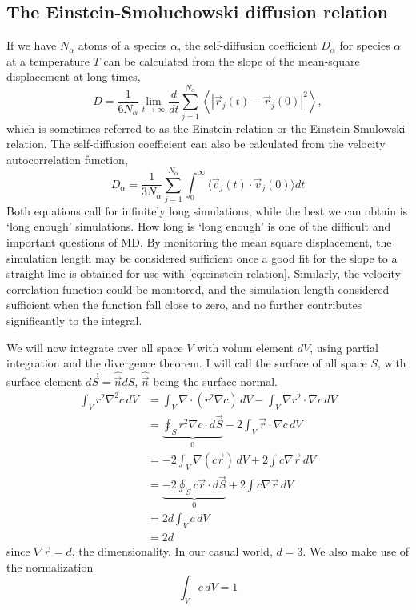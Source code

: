 \documentclass[11pt,bibliography=totoc,index=totoc]{scrbook}   %
\begin{document}
\subsection{The Einstein-Smoluchowski diffusion relation}




If we have $N_{\alpha}$ atoms of a species $\alpha$, the self-diffusion coefficient $D_{\alpha}$ for species $\alpha$ at a temperature $T$ can be calculated from the slope of the mean-square displacement at long times,
\begin{equation}
  D = \frac{1}{6N_{\alpha}} \lim_{t\to\infty} \frac{d}{dt} \sum_{j=1}^{N_{\alpha}} \left \langle |\vec{r}_j(t)-\vec{r}_j(0)|^2 \right\rangle,
  \label{eq:einstein-relation}
\end{equation}
which is sometimes referred to as the Einstein relation or the Einstein Smulowski relation. 
The self-diffusion coefficient can also be calculated from the velocity autocorrelation function,
\begin{equation}
  D_{\alpha} = \frac{1}{3N_{\alpha}} \sum_{j=1}^{N_{\alpha}} \int_0^{\infty} \langle \vec{v}_j(t) \cdot \vec{v}_j(0) \rangle dt
\end{equation}
Both equations call for infinitely long simulations, while the best we can obtain is `long enough' simulations. 
How long is `long enough' is one of the difficult and important questions of MD.
By monitoring the mean square displacement, the simulation length may be considered sufficient once a good fit for the slope to a straight line is obtained for use with \eqref{eq:einstein-relation}.
Similarly, the velocity correlation function could be monitored, and the simulation length considered sufficient when the function fall close to zero, 
and no further contributes significantly to the integral.

We will now integrate over all space $V$ with volum element $dV$, using partial integration and the divergence theorem.
I will call the surface of all space $S$, with surface element $d\vec{S}=\hat{\vec{n}}dS$, $\hat{\vec{n}}$ being the surface normal.
\begin{align}
  \int_V r^2 \nabla^2 c \,dV &= \int_V \nabla\cdot (r^2\nabla c) \,dV - \int_V \nabla r^2 \cdot \nabla c \, dV \\
  &= \underbrace{\oint_S r^2 \nabla c \cdot d\vec{S}}_0 - 2\int_V \vec{r}\cdot\nabla c \,dV \\
  &= -2\int_V \nabla (c\vec{r}) \,dV + 2 \int c \nabla \vec{r} \, dV \\
  &= \underbrace{-2\oint_S c\vec{r}\cdot d\vec{S}}_0 + 2 \int c \nabla \vec{r} \, dV \\
  &= 2d\int_V c \, dV \\
  &= 2d
\end{align}
since $\nabla\vec{r} = d$, the dimensionality. In our casual world, $d=3$. We also make use of the normalization
\begin{equation}
  \int_V c \,dV = 1
\end{equation}
\end{document}
